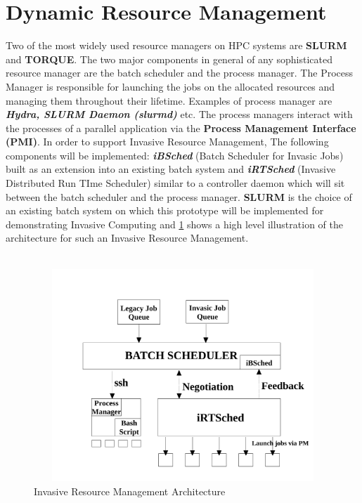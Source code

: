 \section{Dynamic Resource Management}
Two of the most widely used resource managers on HPC systems are \textbf{SLURM} and \textbf{TORQUE}. The two major components in general of any sophisticated resource manager are the batch scheduler and the process manager. The Process Manager is responsible for launching the jobs on the allocated resources and managing them throughout their lifetime. Examples of process manager are \textbf{\textit{Hydra, SLURM Daemon (slurmd)}} etc. The process managers interact with the processes of a parallel application via the \textbf{Process Management Interface (PMI)}. In order to support Invasive Resource Management, The following components will be implemented: \textbf{\textit{iBSched}} (Batch Scheduler for Invasic Jobs) built as an extension into an existing batch system and \textbf{\textit{iRTSched}} (Invasive Distributed Run TIme Scheduler) similar to a controller daemon which will sit between the batch scheduler and the process manager. \textbf{SLURM} is the choice of an existing batch system on which this prototype will be implemented for demonstrating Invasive Computing and \ref{fig:1} shows a high level illustration of the architecture for such an Invasive Resource Management.\\ \\
\begin{figure}[!htbp]
\centering
\includegraphics[width=1.0\textwidth, height=80mm]{./figures/architecture.pdf}
\caption{Invasive Resource Management Architecture}
\label{fig:1}
\end{figure}
\noindent
